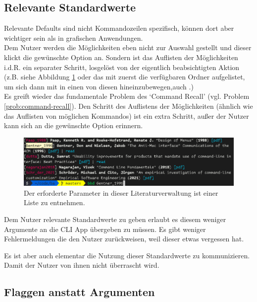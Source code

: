 \documentclass[oneside,bibliography=totocnumbered,BCOR=5mm]{scrbook}
\begin{document}
\subsection{Relevante Standardwerte}

Relevante Defaults sind nicht Kommandozeilen spezifisch, können dort aber
wichtiger sein als in grafischen Anwendungen.
\\
Dem Nutzer werden die Möglichkeiten eben nicht zur Auswahl gestellt und dieser
klickt die gewünschte Option an. Sondern ist das Auflisten der Möglichkeiten
i.d.R. ein separater Schritt, losgelöst von der eigentlich beabsichtigten Aktion
(z.B. siehe Abbildung \ref{fig:defaults-demo} oder das mit 
zuerst die verfügbaren Ordner aufgelistet, um sich dann mit  in einen von diesen hineinzubewegen,auch .)
\\
Es greift wieder das fundamentale Problem des `Command Recall' (vgl. Problem
\ref{prob:command-recall}). Den Schritt des Auflistens der Möglichkeiten
(ähnlich wie das Auflisten von möglichen Kommandos) ist ein extra Schritt, außer
der Nutzer kann sich an die gewünschte Option erinnern.

\begin{figure}
  \centering
  \includegraphics[scale=0.5]{defaults-demo.png}
  \caption{Der erforderte Parameter in dieser Literaturverwaltung ist einer Liste zu entnehmen.}
  \label{fig:defaults-demo}
\end{figure}

\bigskip


Dem Nutzer relevante Standardwerte zu geben erlaubt es diesem weniger
Argumente an die CLI App übergeben zu müssen. Es gibt weniger Fehlermeldungen
die den Nutzer zurückweisen, weil dieser etwas vergessen hat.

Es ist aber auch elementar die Nutzung dieser Standardwerte zu kommunizieren.
Damit der Nutzer von ihnen nicht überrascht wird.

\subsection{Flaggen anstatt Argumenten}
\end{document}

